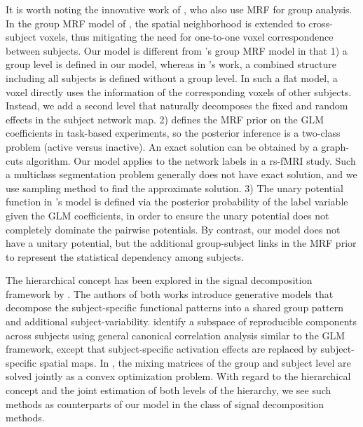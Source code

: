 \documentclass[review,authoryear]{elsarticle}
\begin{document}
It is worth noting the innovative work of \citet{ng2012modeling}, who also use
MRF for group analysis. In the group MRF  model of
\citeauthor{ng2012modeling}, the spatial neighborhood is extended to
cross-subject voxels, thus mitigating the need for one-to-one voxel
correspondence between subjects. Our model is different from
\citeauthor{ng2012modeling}'s group MRF model in that 1) a group level is
defined in our model, whereas in \citeauthor{ng2012modeling}'s work, a combined
structure including all subjects is defined without a group level. In such a
flat model, a voxel directly uses the information of the corresponding voxels of
other subjects. Instead, we add a second level that naturally decomposes the
fixed and random effects in the subject network map. 2)
\citeauthor{ng2012modeling} defines the MRF prior on the GLM coefficients in
task-based experiments, so the posterior inference is a two-class problem
(active versus inactive). An exact solution can be obtained by a graph-cuts
algorithm. Our model applies to the network labels in a rs-fMRI study. Such a
multiclass segmentation problem generally does not have exact solution, and we
use sampling method to find the approximate solution. 3) The unary potential
function in \citeauthor{ng2012modeling}'s model is defined via the posterior
probability of the label variable given the GLM coefficients, in order to
ensure the unary potential does not completely dominate the pairwise
potentials. By contrast, our model does not have a unitary potential, but the
additional group-subject links in the MRF prior to represent the statistical
dependency among subjects.

The hierarchical concept has been explored in the signal decomposition framework
by \citet{varoquaux2010group, varoquaux2011multi}. The authors of both works
introduce generative models that decompose the subject-specific functional
patterns into a shared group pattern and additional subject-variability.
\citet{varoquaux2010group} identify a subspace of reproducible components across
subjects using general canonical correlation analysis similar to the GLM
framework, except that subject-specific activation effects are replaced by
subject-specific spatial maps. In \citet{varoquaux2011multi}, the mixing
matrices of the group and subject level are solved jointly as a convex
optimization problem. With regard to the hierarchical concept and the joint
estimation of both levels of the hierarchy, we see such methods as counterparts
of our model in the class of signal decomposition methods.
\end{document}
